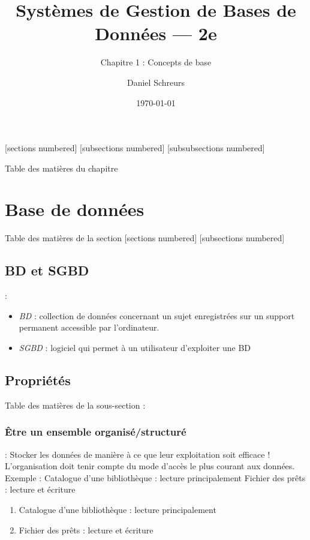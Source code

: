 \documentclass[10pt]{beamer}
\title{Systèmes de Gestion de Bases de Données — 2e}
\subtitle{Chapitre 1 : Concepts de base}
\date{\today}
\author{Daniel Schreurs}
\institute{Haute École de Province de Liège}
\newcommand{\tocsss}{\begin{frame}[allowframebreaks]{Table des matières de la sous-section : \subsecname}
    \tableofcontents[
    currentsection,
    currentsubsection,
    hideothersubsections,
    sectionstyle=hide/hide
]
\end{frame}}
\begin{document}
\maketitle

[sections numbered]
[subsections numbered]
[subsubsections numbered]
\begin{frame}[allowframebreaks]{Table des matières du chapitre}
    \tableofcontents[subsectionstyle=show/show/hide,subsubsectionstyle=show/show/hide,]
\end{frame}

\section{Base de données}
\begin{frame}{Table des matières de la section}
    [sections numbered]
    [subsections numbered]
    \tableofcontents[currentsection,currentsubsection,
        hideothersubsections,
        sectionstyle=show/shaded,
    ]
\end{frame}

\subsection{BD et SGBD}
\begin{frame}{\secname : \subsecname}
    \begin{itemize}
        \item \emph{BD} : collection de données concernant un sujet enregistrées sur un support permanent accessible par l’ordinateur.
        \item \emph{SGBD} : logiciel qui permet à un utilisateur d’exploiter une BD
    \end{itemize}
\end{frame}

\subsection{Propriétés}
\tocsss

\subsubsection{Être un ensemble organisé/structuré}
\begin{frame}{\subsecname : \subsubsecname}
    Stocker les données de manière à ce que leur exploitation soit efficace !
    L’organisation doit tenir compte du mode d’accès le plus courant aux données.
    Exemple :
    Catalogue d’une bibliothèque : lecture principalement
    Fichier des prêts : lecture et écriture
    \begin{enumerate}
        \item Catalogue d’une bibliothèque : lecture principalement
        \item Fichier des prêts : lecture et écriture
    \end{enumerate}
\end{frame}
\end{document}
